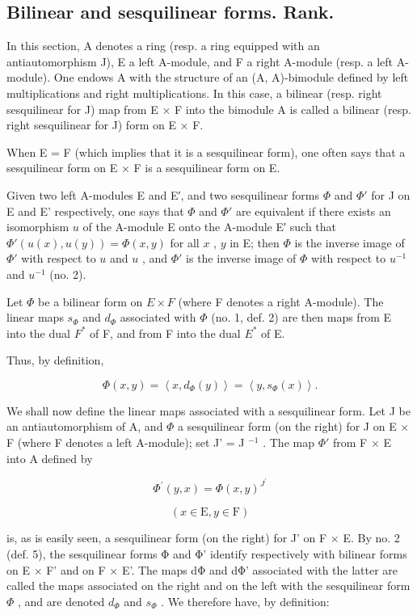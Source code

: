 \subsection{Bilinear and sesquilinear forms. Rank.}

In this section, A denotes a ring (resp. a ring equipped with an antiautomorphism J), E a left A-module, and F a right A-module (resp. a left A-module). One endows A with the structure of an (A, A)-bimodule defined by left multiplications and right multiplications. In this case, a bilinear (resp. right sesquilinear for J) map from E × F into the bimodule A is called a bilinear (resp. right sesquilinear for J) form on E × F.

When E = F (which implies that it is a sesquilinear form), one often says that a sesquilinear form on E × F is a sesquilinear form on E.

Given two left A-modules E and E′, and two sesquilinear forms \(\Phi\) and \(\Phi'\) for J on E and E' respectively, one says that \(\Phi\) and \(\Phi'\) are equivalent if there exists an isomorphism \(u\) of the A-module E onto the A-module E′ such that \(\Phi'(u(x), u(y)) = \Phi(x, y)\) for all \(x\) , \(y\) in E; then \(\Phi\) is the inverse image of \(\Phi'\) with respect to \(u\) and \(u\) , and \(\Phi'\) is the inverse image of \(\Phi\) with respect to \(u^{-1}\) and \(u^{-1}\) (no. 2).

Let \(\Phi\) be a bilinear form on \(E \times F\) (where F denotes a right A-module). The linear maps \(s_{\Phi}\) and \(d_{\Phi}\) associated with \(\Phi\) (no. 1, def. 2) are then maps from E into the dual \(F^{*}\) of F, and from F into the dual \(E^{*}\) of E.

Thus, by definition,

\[
\Phi (x, y) = \left\langle x, d _ {\Phi} (y) \right\rangle = \left\langle y, s _ {\Phi} (x) \right\rangle .\tag{23}
\]

We shall now define the linear maps associated with a sesquilinear form. Let J be an antiautomorphism of A, and \(\Phi\) a sesquilinear form (on the right) for J on E × F (where F denotes a left A-module); set J' = J \(^{-1}\) . The map \(\Phi'\) from F × E into A defined by

\[
\Phi^ {\prime} (y, x) = \Phi (x, y) ^ {J ^ {\prime}}
\]

\[
(x \in \mathrm{E}, y \in \mathrm{F})
\]

is, as is easily seen, a sesquilinear form (on the right) for J' on F × E. By no. 2 (def. 5), the sesquilinear forms Φ and Φ' identify respectively with bilinear forms on E × F' and on F × E'. The maps dΦ and dΦ' associated with the latter are called the maps associated on the right and on the left with the sesquilinear form \(\Phi\) , and are denoted \(d_{\Phi}\) and \(s_{\Phi}\) . We therefore have, by definition:

